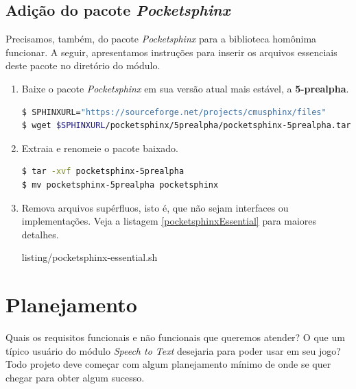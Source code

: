
\subsection{Adição do pacote \textit{Pocketsphinx}}

Precisamos, também, do pacote \textit{Pocketsphinx} para a biblioteca homônima funcionar. A seguir, apresentamos instruções para inserir os arquivos essenciais deste pacote no diretório do módulo.

\begin{enumerate}
\item Baixe o pacote \textit{Pocketsphinx} em sua versão atual mais estável, a \textbf{5-prealpha}.

\begin{lstlisting}[language=Bash]
$ SPHINXURL="https://sourceforge.net/projects/cmusphinx/files"
$ wget $SPHINXURL/pocketsphinx/5prealpha/pocketsphinx-5prealpha.tar.gz
\end{lstlisting}

\item Extraia e renomeie o pacote baixado.

\begin{lstlisting}[language=Bash]
$ tar -xvf pocketsphinx-5prealpha
$ mv pocketsphinx-5prealpha pocketsphinx
\end{lstlisting}

\item Remova arquivos supérfluos, isto é, que não sejam interfaces ou implementações. Veja a listagem \ref{pocketsphinxEssential} para maiores detalhes.


  {listing/pocketsphinx-essential.sh}
\end{enumerate}


\section{Planejamento}

Quais os requisitos funcionais e não funcionais que queremos atender? O que um típico usuário do módulo \textit{Speech to Text} desejaria para poder usar em seu jogo? Todo projeto deve começar com algum planejamento mínimo de onde se quer chegar para obter algum sucesso.

